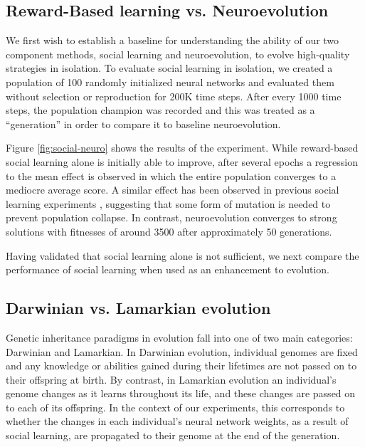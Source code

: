 \documentclass{acm_proc_article-sp}
\begin{document}
\subsection*{Reward-Based learning vs. Neuroevolution}

We first wish to establish a baseline for understanding the ability of our two component methods, social learning and neuroevolution, to evolve high-quality strategies in isolation. To evaluate social learning in isolation, we created a population of 100 randomly initialized neural networks and evaluated them without selection or reproduction for 200K time steps. After every 1000 time steps, the population champion was recorded and this was treated as a ``generation'' in order to compare it to baseline neuroevolution.

Figure \ref{fig:social-neuro} shows the results of the experiment. While reward-based social learning alone is initially able to improve, after several epochs a regression to the mean effect is observed in which the entire population converges to a mediocre average score. A similar effect has been observed in previous social learning experiments \cite{denaro1996cultural}, suggesting that some form of mutation is needed to prevent population collapse. In contrast, neuroevolution converges to strong solutions with fitnesses of around 3500 after approximately 50 generations.

Having validated that social learning alone is not sufficient, we next compare the performance of social learning when used as an enhancement to evolution.


\subsection*{Darwinian vs. Lamarkian evolution}

Genetic inheritance paradigms in evolution fall into one of two main categories: Darwinian and Lamarkian. In Darwinian evolution, individual genomes are fixed and any knowledge or abilities gained during their lifetimes are not passed on to their offspring at birth. By contrast, in Lamarkian evolution an individual's genome changes as it learns throughout its life, and these changes are passed on to each of its offspring. In the context of our experiments, this corresponds to whether the changes in each individual's neural network weights, as a result of social learning, are propagated to their genome at the end of the generation.
\end{document}
